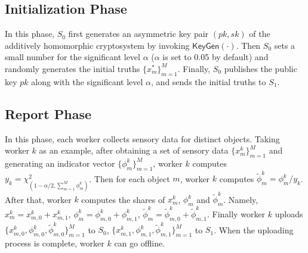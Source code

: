\documentclass[conference]{IEEEtran}
\begin{document}
\subsection{Initialization Phase}
In this phase, $S_0$ first generates an asymmetric key pair $(pk, sk)$ of the additively homomorphic cryptosystem by invoking $\mathsf{KeyGen}(\cdot)$.
Then $S_0$ sets a small number for the significant level $\alpha$ ($\alpha$ is set to 0.05 by default) and randomly generates the initial truths $\{x_m^*\}_{m=1}^M$.
Finally, $S_0$ publishes the public key $pk$ along with the significant level $\alpha$, and sends the initial truths to $S_1$.

\subsection{Report Phase}
In this phase, each worker collects sensory data for distinct objects.
Taking worker $k$ as an example, after obtaining a set of sensory data $\{x_m^k\}_{m=1}^M$ and generating an indicator vector $\{\phi_m^k\}_{m=1}^M$, worker $k$ computes $y_k = \chi^2_{(1-\alpha/2, \sum_{m=1}^M \phi_m^k)}$.
Then for each object $m$, worker $k$ computes $\tilde{\phi}_m^k = \phi_m^k / y_k$.
After that, worker $k$ computes the shares of $x_m^k$, $\phi_m^k$ and $\tilde{\phi}_m^k$.
Namely, $x_m^k = x_{m,0}^k + x_{m,1}^k$, $\phi_m^k = \phi_{m,0}^k + \phi_{m,1}^k$, $\tilde{\phi}_m^k = \tilde{\phi}_{m,0}^k + \tilde{\phi}_{m,1}^k$.
Finally worker $k$ uploads $\{x_{m,0}^k, \phi_{m,0}^k ,\tilde{\phi}_{m,0}^k\}_{m=1}^M$ to $S_0$, $\{x_{m,1}^k, \phi_{m,1}^k, \tilde{\phi}_{m,1}^k\}_{m=1}^M$ to $S_1$.
When the uploading process is complete, worker $k$ can go offline.
\end{document}
